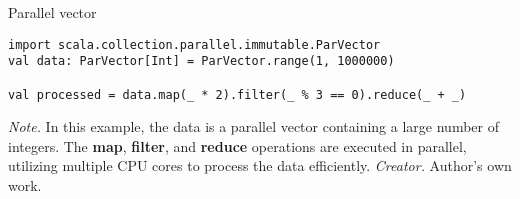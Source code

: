 \begin{table}[h!]
\caption{Parallel vector}
\begin{lstlisting}
import scala.collection.parallel.immutable.ParVector
val data: ParVector[Int] = ParVector.range(1, 1000000)

val processed = data.map(_ * 2).filter(_ % 3 == 0).reduce(_ + _)
\end{lstlisting}
\small
\textit{Note.} In this example, the data is a parallel vector containing a large number of integers. The \textbf{map}, \textbf{filter}, and \textbf{reduce} operations are executed in parallel, utilizing multiple CPU cores to process the data efficiently.
\textit{Creator.} Author's own work.
\end{table}